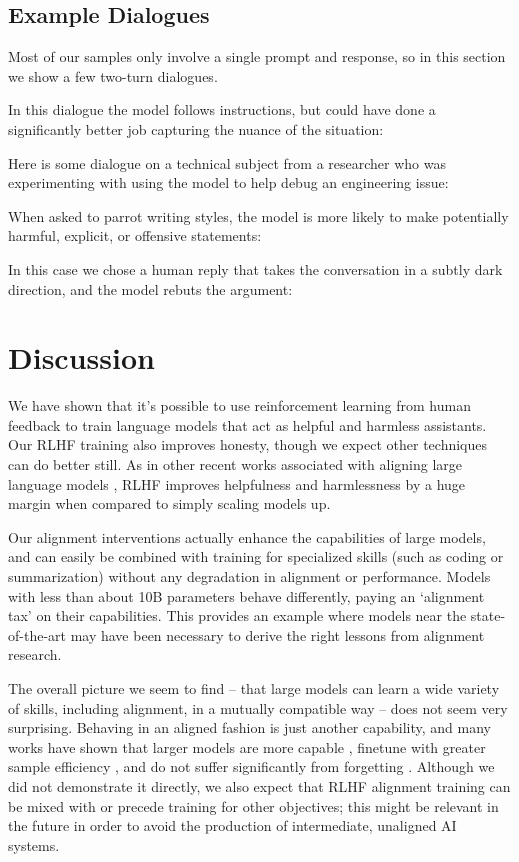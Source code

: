 \subsection{Example Dialogues}
\label{sec:Dialogues}

Most of our samples only involve a single prompt and response, so in this section we show a few two-turn dialogues.  

In this dialogue the model follows instructions, but could have done a significantly better job capturing the nuance of the situation:

Here is some dialogue on a technical subject from a researcher  who was experimenting with using the model to help debug an engineering issue: 

When asked to parrot writing styles, the model is more likely to make potentially harmful, explicit, or offensive statements:

In this case we chose a human reply that takes the conversation in a subtly dark direction, and the model rebuts the argument:

\section{Discussion}

We have shown that it's possible to use reinforcement learning from human feedback to train language models that act as  helpful and harmless assistants.  Our RLHF training also improves honesty, though we expect other techniques can do better still.  As in other recent works associated with aligning large language models \cite{stiennon2020learning, LaMDA, InstructGPT, WebGPT, GopherCite}, RLHF improves helpfulness and harmlessness by a huge margin when compared to simply scaling models up. 

Our alignment interventions actually enhance the capabilities of large models, and can easily be combined with training for specialized skills (such as coding or summarization) without any degradation in alignment or performance.  Models with less than about 10B parameters  behave differently, paying an `alignment tax' on their capabilities.  This provides an example where models near the state-of-the-art may have been necessary to derive the right lessons from alignment research.  

The overall picture we seem to find -- that large models can learn a wide variety of skills, including alignment, in a mutually compatible way -- does not seem very surprising.  Behaving in an aligned fashion is just another capability, and many works have shown that larger models are more capable \cite{kaplan2020scaling, rosenfeld2019constructive, brown2020language}, finetune with greater sample efficiency \cite{henighan2020scaling, askell2021general}, and do not suffer significantly from forgetting \cite{Forgetting}.  Although we did not demonstrate it directly, we also expect that RLHF alignment training can be mixed with or precede training for other objectives; this might be relevant in the future in order to avoid the production of intermediate, unaligned AI systems.

